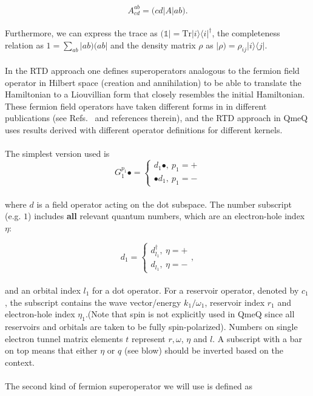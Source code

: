 \documentclass{article}
\newcommand{\oph}[2]{\ensuremath{|#1\rangle\langle#2|}}
\newcommand{\bral}[1]{\ensuremath{( #1 |}}
\newcommand{\ketl}[1]{\ensuremath{|#1)}}
\begin{document}
\begin{equation}
	A^{ab}_{cd} = \bral{cd}A\ketl{ab}.
\end{equation}
\\
Furthermore, we can express the trace as $\bral{\mathbb{1}} = \text{Tr} \oph{i}{i}^\dagger$, the completeness relation as $1 = \sum_{ab}\ketl{ab}\bral{ab}$ and the density matrix $\rho$ as $\ketl{\rho}= \rho_{ij}\oph{i}{j}.$
\\
\\
In the RTD approach one defines superoperators analogous to the fermion field operator in Hilbert space (creation and annihilation) to be able to translate the Hamiltonian to a Liouvillian form that closely resembles the initial Hamiltonian. These fermion field operators have taken different forms in in different publications (see Refs.~\cite{leijnse2008kinetic, saptsov2012fermionic, gergs2015charge, gergs2017transport, gergs2018spin} and references therein), and the RTD approach in QmeQ uses results derived with different operator definitions for different kernels.
\\\\
The simplest version used is 
\begin{equation}
	G^{p_1}_1 \bullet = 
	\begin{cases}
		d_1\bullet,\ p_1=+ \\
		\bullet d_1,\ p_1=-
	\end{cases}
	\label{Eq:G1}
\end{equation}
\\
where $d$ is a field operator acting on the dot subspace. The number subscript (e.g. $1$) includes \textbf{all} relevant quantum numbers, which are an electron-hole index $\eta$:

\begin{equation}
	d_1 = 
	\begin{cases}
		d_{l_1}^\dagger, \ \eta=+\\
		d_{l_1}, \ \eta=-
	\end{cases},	
\end{equation}
\\
and an orbital index $l_1$ for a dot operator. For a reservoir operator, denoted by $c_1$, the subscript contains the wave vector/energy $k_1/\omega_1$, reservoir index $r_1$ and electron-hole index $\eta_1$.(Note that spin is not explicitly used in QmeQ since all reservoirs and orbitals are taken to be fully spin-polarized). Numbers on single electron tunnel matrix elements $t$ represent $r, \omega$, $\eta$ and $l$. A subscript with a bar on top means that either $\eta$ or $q$ (see blow) should be inverted based on the context.
\\
\\
The second kind of fermion superoperator we will use is defined as~\cite{saptsov2012fermionic}
\end{document}
